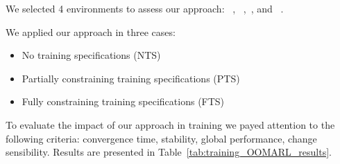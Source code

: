 \documentclass[runningheads]{llncs}
\begin{document}


We selected 4 environments to assess our approach: ~\cite{Lowe2017},
~\cite{Kurach2020},~\cite{Terry2021}, and ~\cite{Terry2021}.


We applied our approach in three cases:
\begin{itemize}
    \item No training specifications (NTS)
    \item Partially constraining training specifications (PTS)
    \item Fully constraining training specifications (FTS)
\end{itemize}

To evaluate the impact of our approach in training we payed attention to the following criteria: convergence time, stability, global performance, change sensibility. Results are presented in Table~\ref{tab:training_OOMARL_results}.
\end{document}
